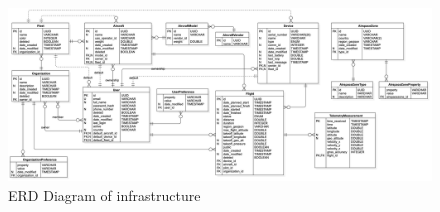 \begin{figure}
    \centering
    \includegraphics[scale=0.3, angle=90]{assets/erd_diagram.png}
    \caption{ERD Diagram of infrastructure}
    \label{fig:erd-diagram}
\end{figure}
